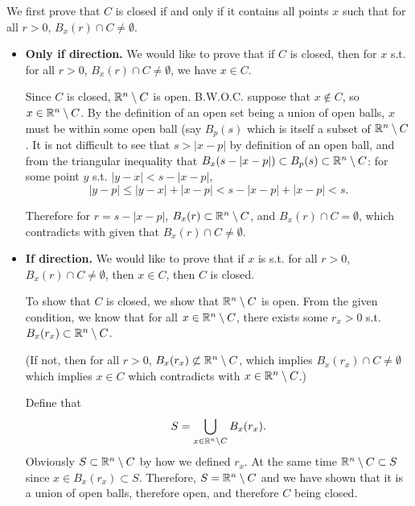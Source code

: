 We first prove that \(C\) is closed if and only if it contains all points \(x\) such that for all \(r > 0\), \(B_x(r) \cap C \neq \emptyset\).

\begin{itemize}
    \item \textbf{Only if direction.} We would like to prove that if \(C\) is closed, then for \(x\) s.t. for all \(r > 0\), \(B_x(r) \cap C \neq \emptyset\), we have \(x \in C\).

    Since \(C\) is closed, \(\mathbb{R}^n \setminus C\) is open. B.W.O.C. suppose that \(x \notin C\), so \(x \in \mathbb{R}^n \setminus C\). By the definition of an open set being a union of open balls, \(x\) must be within some open ball (say \(B_p(s)\) which is itself a subset of \(\mathbb{R}^n \setminus C\). It is not difficult to see that \(s > |x - p|\) by definition of an open ball, and from the triangular inequality that \(B_x(s - |x - p|) \subset B_p(s) \subset \mathbb{R}^n \setminus C\): for some point \(y\) s.t. \(|y - x| < s - |x - p|\),
    \[|y - p| \leq |y - x| + |x - p| < s - |x - p| + |x - p| < s.\]

    Therefore for \(r = s - |x - p|\), \(B_x(r) \subset \mathbb{R}^n \setminus C\), and \(B_x(r) \cap C = \emptyset\), which contradicts with given that \(B_x(r) \cap C \neq \emptyset\).

    \item \textbf{If direction.} We would like to prove that if \(x\) is s.t. for all \(r > 0\), \(B_x(r) \cap C \neq \emptyset\), then \(x \in C\), then \(C\) is closed.

    To show that \(C\) is closed, we show that \(\mathbb{R}^n \setminus C\) is open. From the given condition, we know that for all \(x \in \mathbb{R}^n \setminus C\), there exists some \(r_x > 0\) s.t. \(B_x(r_x) \subset \mathbb{R}^n \setminus C\).
    
    (If not, then for all \(r > 0\), \(B_x(r_x) \not\subset \mathbb{R}^n \setminus C\), which implies \(B_x(r_x) \cap C \neq \emptyset\) which implies \(x \in C\) which contradicts with \(x \in \mathbb{R}^n \setminus C\).)
    
    Define that
    \[
        S = \bigcup_{x \in \mathbb{R}^n \setminus C} B_x (r_x).
    \]
    Obviously \(S \subset \mathbb{R}^n \setminus C\) by how we defined \(r_x\). At the same time \(\mathbb{R}^n\setminus C \subset S\) since \(x \in B_x(r_x) \subset S\). Therefore, \(S = \mathbb{R}^n \setminus C\) and we have shown that it is a union of open balls, therefore open, and therefore \(C\) being closed.
\end{itemize}

